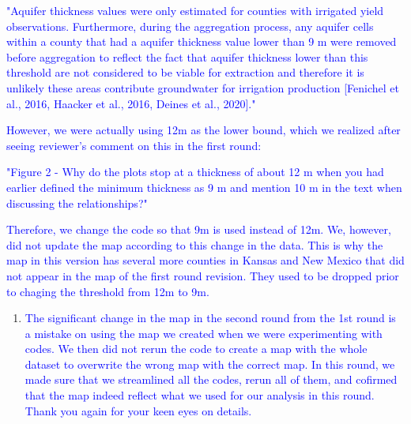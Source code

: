 \documentclass[
]{article}
\providecommand{\tightlist}{%
  \setlength{\itemsep}{0pt}\setlength{\parskip}{0pt}}
\begin{document}
\textcolor{blue}{"Aquifer thickness values were only estimated for counties with irrigated yield observations. Furthermore, during the aggregation process, any aquifer cells within a county that had a aquifer thickness value lower than 9 m were removed before aggregation to reflect the fact that aquifer thickness lower than this threshold are not considered to be viable for extraction and therefore it is unlikely these areas contribute groundwater for irrigation production [Fenichel et al., 2016, Haacker et al., 2016, Deines et al., 2020]."}

\textcolor{blue}{However, we were actually using 12m as the lower bound, which we realized after seeing reviewer's comment on this in the first round:}

\textcolor{blue}{"Figure 2 - Why do the plots stop at a thickness of about 12 m when you had earlier defined the minimum thickness as 9 m and mention 10 m in the text when discussing the relationships?"}

\textcolor{blue}{Therefore, we change the code so that 9m is used instead of 12m. We, however, did not update the map according to this change in the data. This is why the map in this version has several more counties in Kansas and New Mexico that did not appear in the map of the first round revision. They used to be dropped prior to chaging the threshold from 12m to 9m.}

\begin{enumerate}
\def\labelenumi{\arabic{enumi}.}
\setcounter{enumi}{1}
\tightlist
\item
  \textcolor{blue}{The significant change in the map in the second round from the 1st round is a mistake on using the map we created when we were experimenting with codes. We then did not rerun the code to create a map with the whole dataset to overwrite the wrong map with the correct map. In this round, we made sure that we streamlined all the codes, rerun all of them, and cofirmed that the map indeed reflect what we used for our analysis in this round. Thank you again for your keen eyes on details.}
\end{enumerate}
\end{document}
